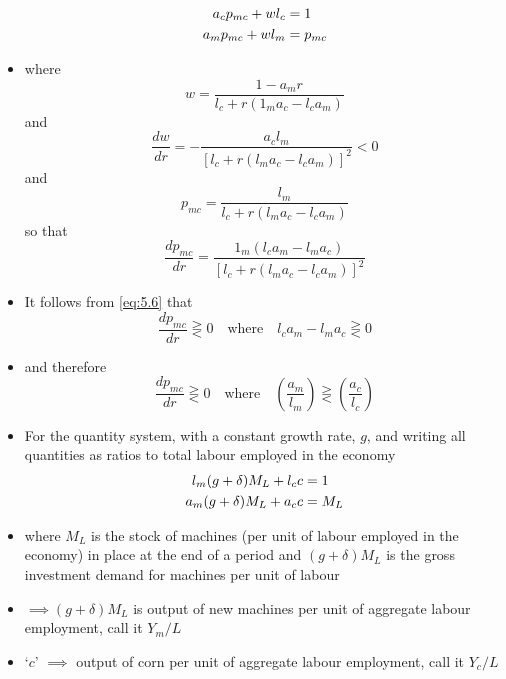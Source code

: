 \documentclass[a4paper,twoside]{article}
\numberwithin{equation}{section}
\numberwithin{figure}{section}
\begin{document}
\begin{itemize}
\begin{align}
			a_c p_{mc} + w l_c &= 1 \notag \\
			a_m p_{mc} + w l_m &= p_{mc} \label{eq:5.2}
		\end{align}
		\item where
		\begin{equation}
			w = \frac{1 - a_m r}{l_c + r (1_m a_c - l_c a_m)} \label{eq:5.3}
		\end{equation}
		and
		\begin{equation}
			\frac{dw}{dr}  = - \frac{a_c l_m}{[l_c + r(l_m a_c - l_c a_m)]^2} < 0 \label{eq:5.4}
		\end{equation}
		and
		\begin{equation}
			p_{mc} = \frac{l_m}{l_c + r (l_m a_c - l_c a_m)} \label{eq:5.5}
		\end{equation}
		so that
		\begin{equation}
			\frac{dp_{mc}}{dr} = \frac{1_m (l_c a_m - l_m a_c)}{[l_c + r(l_m a_c - l_c a_m)]^2} \label{eq:5.6}
		\end{equation}
		\item It follows from \cref{eq:5.6} that
		\begin{equation}
			\frac{dp_{mc}}{dr} \gtreqless 0 \quad \text{where} \quad l_c a_m - l_m a_c \gtreqless 0 \label{eq:5.7}
		\end{equation}
		\item and therefore
		\begin{equation}
			\frac{dp_{mc}}{dr} \gtreqless 0 \quad \text{where} \quad \left( \frac{a_m}{l_m} \right) \gtreqless \left( \frac{a_c}{l_c} \right) \label{eq:5.8}
		\end{equation}
		\item For the quantity system, with a constant growth rate, \( g \), and writing all quantities as ratios to total labour employed in the economy
		\begin{align}
			l_m (g + \delta) M_L + l_c c &= 1 \notag \\
			a_m (g + \delta) M_L + a_c c &= M_L \label{eq:5.9}
		\end{align}
		\item where \( M_L \) is the stock of machines (per unit of labour employed in the economy) in place at the end of a period and \( (g + \delta) M_L \) is the gross investment demand for machines per unit of labour
		\item \( \implies (g+ \delta) M_L \) is output of new machines per unit of aggregate labour employment, call it \( Y_m / L \) 
		\item `\( c \)' \( \implies \) output of corn per unit of aggregate labour employment, call it \( Y_c / L \) 

\end{itemize}
\end{document}
